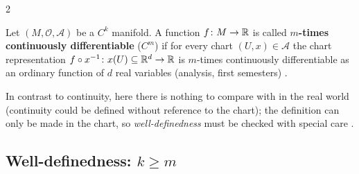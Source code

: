 \begin{paracol}{2}
\begin{definition}\label{def:dm-cm-fn}
Let $(M,\mathcal O,\mathcal A)$ be a $C^k$ manifold. A function $f\colon M\to\mathbb{R}$ is called \textbf{$m$-times continuously
differentiable} ($C^m$) if for every chart $(U,x)\in\mathcal A$ the chart representation
$f\circ x^{-1}\colon x(U)\subseteq\mathbb{R}^d\to\mathbb{R}$ is $m$-times continuously differentiable as an ordinary function of $d$ real
variables (analysis, first semesters) .
\end{definition}
In contrast to continuity, here there is nothing to compare with in the real world (continuity could be defined without
reference to the chart); the definition can only be made in the chart, so \emph{well-definedness} must be checked with special
care .

\subsection{Well-definedness: $k\ge m$}\label{ssec:dm-welldef}


\end{paracol}
